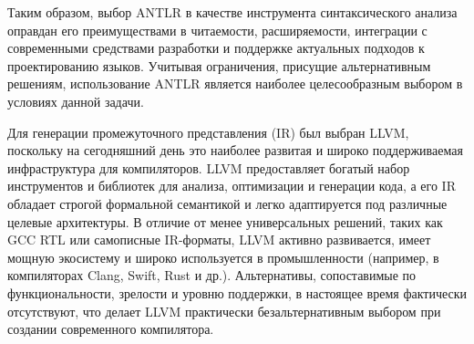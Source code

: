 Таким образом, выбор ANTLR в качестве инструмента синтаксического анализа оправдан его преимуществами в читаемости, расширяемости, интеграции с современными средствами разработки и поддержке актуальных подходов к проектированию языков. 
Учитывая ограничения, присущие альтернативным решениям, использование ANTLR является наиболее целесообразным выбором в условиях данной задачи.

Для генерации промежуточного представления (IR) был выбран LLVM, поскольку на сегодняшний день это наиболее развитая и широко поддерживаемая инфраструктура для компиляторов. 
LLVM предоставляет богатый набор инструментов и библиотек для анализа, оптимизации и генерации кода, а его IR обладает строгой формальной семантикой и легко адаптируется под различные целевые архитектуры. 
В отличие от менее универсальных решений, таких как GCC RTL или самописные IR-форматы, LLVM активно развивается, имеет мощную экосистему и широко используется в промышленности (например, в компиляторах Clang, Swift, Rust и др.). 
Альтернативы, сопоставимые по функциональности, зрелости и уровню поддержки, в настоящее время фактически отсутствуют, что делает LLVM практически безальтернативным выбором при создании современного компилятора.

